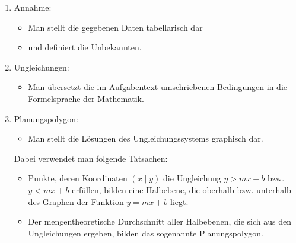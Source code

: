 \documentclass[%
11pt,%
twoside,%
titlepage,%
swissgerman,%
headsepline%
]{scrartcl}
\theoremstyle{definition}
\theoremstyle{plain}
\theoremstyle{plain}
\begin{document}
		\begin{enumerate}
			\item Annahme:
			\begin{itemize}
				\item Man stellt die gegebenen Daten tabellarisch dar
				\item und definiert die Unbekannten.
			\end{itemize}
			\item Ungleichungen:
			\begin{itemize}
				\item Man übersetzt die im Aufgabentext umschriebenen
				Bedingungen in die Formelsprache der Mathematik.
			\end{itemize}
			\item Planungspolygon:
			\begin{itemize}
				\item Man stellt die Lösungen des Ungleichungssystems graphisch
				dar.
			\end{itemize}
			Dabei verwendet man folgende Tatsachen:
			\begin{itemize}
				\item Punkte, deren Koordinaten $(x\mid y)$ die Ungleichung $y>mx+b$
				bzw. $y<mx+b$ erfüllen, bilden eine Halbebene, die oberhalb bzw.
				unterhalb des Graphen der Funktion $y=mx+b$ liegt.
				\item Der mengentheoretische Durchschnitt aller Halbebenen, die
				sich aus den Ungleichungen ergeben, bilden das sogenannte
				Planungspolygon.
			\end{itemize}
			

\end{enumerate}
\end{document}
